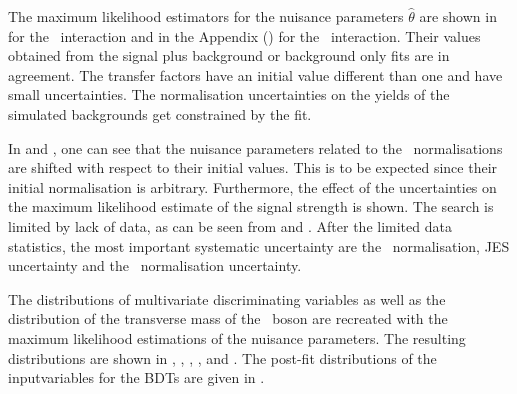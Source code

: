 The maximum likelihood estimators for the nuisance parameters $\hat{\theta}$ are shown in  for the \Zct\ interaction and in the Appendix () for the \Zut\ interaction. Their values obtained from the signal plus background or background only fits are in agreement. The transfer factors have an initial value different than one and have small uncertainties. The normalisation uncertainties on the yields of the simulated backgrounds get constrained by the fit.  %

 In  and , one can see that the nuisance parameters related to the \NPL\ normalisations are shifted with respect to their initial values. This is to be expected since their initial  normalisation is arbitrary. Furthermore, the effect of the uncertainties on the maximum likelihood estimate of the signal strength is shown. The search is limited by lack of data, as can be seen from  and . After the limited data statistics, the most important systematic uncertainty are the \ttZ\ normalisation, JES uncertainty and the \NPL\ normalisation uncertainty. 
 
  The distributions of multivariate discriminating  variables as well as the distribution of the transverse mass of the \PW\ boson are recreated with the maximum likelihood estimations of the nuisance parameters. The resulting distributions are shown in , , , , and . The post-fit distributions of the inputvariables for the BDTs are given in . 


